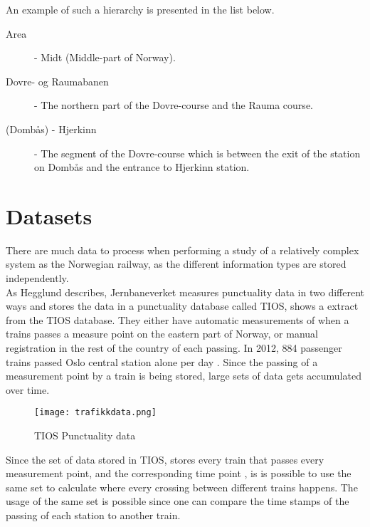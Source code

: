 \bigskip
An example of such a hierarchy is presented in the list below.

\begin{description}
	\item [Area] - Midt (Middle-part of Norway).
	\item [Dovre- og Raumabanen] - The northern part of the Dovre-course and the
	Rauma course.
	\item [(Dombås) - Hjerkinn] - The segment of the Dovre-course which is 
	between the exit of the station on Dombås and the entrance to Hjerkinn
	station.
\end{description}


\section{Datasets} %
\label{sec:back_data_sets}
There are much data to process when performing a study of a relatively complex 
system as the Norwegian railway, as the different information types are stored
independently.\\

As Hegglund\cite[pp. 10-11]{hegglundPunklighetsdataIJernbanetraffik} describes,
Jernbaneverket measures punctuality data in two different ways and stores the
data in a punctuality database called TIOS,  shows a extract from the TIOS database. They either have automatic measurements of when a 
trains passes a measure point on the eastern part of Norway, or manual 
registration in the rest of the country of each passing. In 2012,  884 passenger trains passed Oslo central station alone per day \cite[p. 12]{jernbaneverketStatistikk}.
Since the passing of a measurement point by a train is being stored, large sets
of data gets accumulated over time.

\begin{figure}[!htbp]
	\texttt{[image: trafikkdata.png]}
	\caption[TIOS Punctuality data]{TIOS Punctuality data \cite{sintefPresis}}
	\label{fig:jernbaneverket-trafikkdata}
\end{figure}

Since the set of data stored in TIOS, stores every train that passes every 
measurement point, and the corresponding time point , is is possible
to use the same set to calculate where every crossing between different trains
happens. The usage of the same set is possible since one can compare the time 
stamps of the passing of each station to another train.\\

